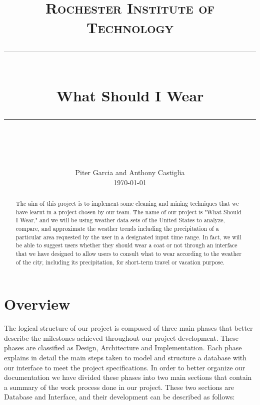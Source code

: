\documentclass{sig-alternate}
\begin{document}
\newcommand{\horrule}[1]{\rule{\linewidth}{#1}} 	

\title{
		\normalfont\normalsize 
		\textsc{Rochester Institute of Technology}	\\ [25pt]
		\horrule{0.5pt} 								\\[0.4cm]
		\huge What Should I Wear 					\\
		\horrule{2pt} 								\\[0.5cm]
		\vspace{-10mm}
}

\author{
		\normalfont\normalsize 
        Piter Garcia and Anthony Castiglia			\\[-3pt]
        	\normalsize\today
}
\date{}
\maketitle

\begin{abstract}

	The aim of this project is to implement some cleaning and mining techniques that we have learnt in a 	project chosen by our team. The name of our project is "What Should I Wear," and we will be using 		weather data sets of the United States to analyze, compare, and approximate the weather trends 			including the precipitation of a particular area requested by the user in a designated input time 		range. In fact, we will be able to suggest users whether they should wear a coat or not through an 	interface that we have designed to allow users to consult what to wear according to the weather of 		the city, including its precipitation, for short-term travel or vacation purpose.
\end{abstract}
\vspace{5 mm}

\section{Overview}
	\label{overview}

	The logical structure of our project is composed of three main phases that better describe the 			milestones achieved throughout our project development. These phases are classified as Design, 			Architecture and Implementation. Each phase explains in detail the main steps taken to model and 			structure a database with our interface to meet the project specifications. In order to better 			organize our documentation we have divided these phases into two main sections that contain a 			summary of the work process done in our project. These two sections are Database and Interface, and 		their development can be described as follows:\newline
\end{document}
